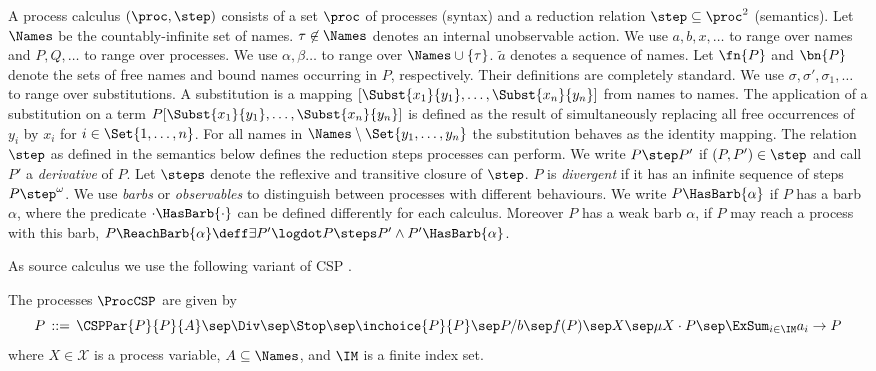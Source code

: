 \documentclass[copyright,creativecommons]{eptcs}
\begin{document}
A process calculus $ \left( \proc, {\step} \right) $ consists of a set $ \proc $ of processes (syntax) and a reduction relation $ {\step} \subseteq \proc^2 $ (semantics).
Let $\Names$ be the countably-infinite set of names.
$\tau \not\in \Names$ denotes an internal unobservable action.
We use $ a, b, x, \ldots $ to range over names and $ P, Q, \ldots $ to range over processes.
We use $\alpha, \beta \ldots$ to range over $\Names \cup \{\tau\}$.
$\tilde{a}$ denotes a sequence of names.
Let $ \fn{P} $ and $ \bn{P} $  denote the sets of free names and bound names occurring in $P$, respectively.
Their definitions are completely standard.
We use $\sigma, \sigma', \sigma_{1}, \ldots$ to range over substitutions.
A substitution is a mapping $[\Subst{x_{1}}{y_{1}}, \ldots ,\Subst{x_{n}}{y_{n}}]$ from names to names.
The application of a substitution on a term $P[\Subst{x_{1}}{y_{1}}, \ldots ,\Subst{x_{n}}{y_{n}}]$ is defined as the result of simultaneously replacing all free occurrences of $y_{i}$ by $x_{i}$ for $i \in \Set{1, \ldots, n}$.
For all names in $\Names \setminus \Set{y_{1}, \ldots, y_{n}}$ the substitution behaves as the identity mapping.
The relation $\step$ as defined in the semantics below defines the reduction steps processes can perform. We write $ P \step P' $ if $ (P, P') \in {\step} $ and call $ P' $ a \emph{derivative} of $ P $.
Let $ \steps $ denote the reflexive and transitive closure of $ \step $.
$ P $ is \emph{divergent} if it has an infinite sequence of steps $ P \step^{\omega} $.
We use \emph{barbs} or \emph{observables} to distinguish between processes with different behaviours. We write $ P\HasBarb{\alpha} $ if $ P $ has a barb $ \alpha $, where the predicate $ \cdot\HasBarb{\cdot} $ can be defined differently for each calculus. Moreover $ P $ has a weak barb $ \alpha $, if $ P $ may reach a process with this barb, \ie $ P\ReachBarb{\alpha} \deff \exists P'\logdot P \steps P' \wedge P'\HasBarb{\alpha} $.

As source calculus we use the following variant of CSP \cite{hoare:78csp}.

\begin{definition}\label{CSPSyntax}
The processes $\ProcCSP$ are given by
$$P \;\mathop{::=}\; \CSPPar{P}{P}{A} \sep \Div \sep \Stop \sep \inchoice{P}{P} \sep P/b \sep f(P) \sep X \sep \mu X \cdot P \sep \textstyle{\ExSum_{i \in \IM}} a_i \rightarrow P$$
	where $X \in \mathcal{X}$ is a process variable, $A \subseteq \Names$, and $ \IM $ is a finite index set.
\end{definition}
\end{document}
